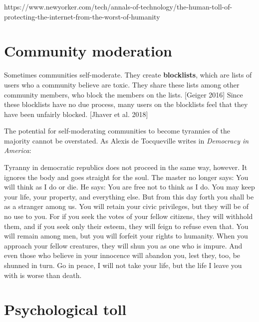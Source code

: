 \documentclass[class=book, crop=false]{standalone}
\providecommand{\keyterm}[1]{\textbf{#1}\marginnote{\scriptsize \textbf{#1}}}
\begin{document}
https://www.newyorker.com/tech/annals-of-technology/the-human-toll-of-protecting-the-internet-from-the-worst-of-humanity\\

\section{Community moderation}

Sometimes communities self-moderate. They create \keyterm{blocklists}, which are lists of users who a community believe are toxic. They share these lists among other community members, who block the members on the lists. [Geiger 2016] Since these blocklists have no due process, many users on the blocklists feel that they have been unfairly blocked. [Jhaver et al. 2018]

The potential for self-moderating communities to become tyrannies of the majority cannot be overstated. As Alexis de Tocqueville writes in \textit{Democracy in America}:

\begin{displayquote}
    Tyranny in democratic republics does not proceed in the same way, however. It ignores the body and goes straight for the soul. The master no longer says: You will think as I do or die. He says: You are free not to think as I do. You may keep your life, your property, and everything else. But from this day forth you shall be as a stranger among us. You will retain your civic privileges, but they will be of no use to you. For if you seek the votes of your fellow citizens, they will withhold them, and if you seek only their esteem, they will feign to refuse even that. You will remain among men, but you will forfeit your rights to humanity. When you approach your fellow creatures, they will shun you as one who is impure. And even those who believe in your innocence will abandon you, lest they, too, be shunned in turn. Go in peace, I will not take your life, but the life I leave you with is worse than death.
\end{displayquote}

\section{Psychological toll}
\end{document}
